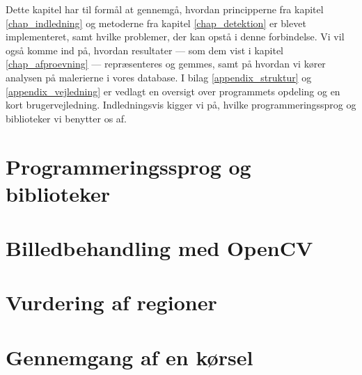 {
{\sffamily Dette kapitel har til formål at gennemgå, hvordan
principperne fra kapitel \ref{chap_indledning} og metoderne fra kapitel
\ref{chap_detektion} er blevet implementeret, samt hvilke problemer, der
kan opstå i denne forbindelse. Vi vil også komme ind på, hvordan
resultater --- som dem vist i kapitel \ref{chap_afproevning} ---
repræsenteres og gemmes, samt på hvordan vi kører analysen på malerierne
i vores database. I bilag \ref{appendix_struktur} og
\ref{appendix_vejledning} er vedlagt en oversigt over programmets
opdeling og en kort brugervejledning.  Indledningsvis kigger vi på,
hvilke programmeringssprog og biblioteker vi benytter os af.
}

\section{Programmeringssprog og biblioteker\label{section_programmeringssprog}}


\section{Billedbehandling med OpenCV\label{section_impBilledbehandling}}


\section{Vurdering af regioner\label{section_vurdering_regioner}}


\section{Gennemgang af en kørsel\label{section_koersel}}


%

}
